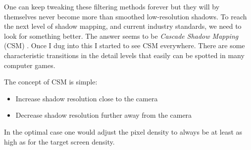 One can keep tweaking these filtering methods forever but they will by themselves never become more than smoothed low-resolution shadows. To reach the next level of shadow mapping, and current industry standards, we need to look for something better. The answer seems to be \textit{Cascade Shadow Mapping} (CSM) \cite{CascadeShadowMapping}. Once I dug into this I started to see CSM everywhere. There are some characteristic transitions in the detail levels that easily can be spotted in many computer games.

The concept of CSM is simple:

\begin{itemize}
\item Increase shadow resolution close to the camera
\item Decrease shadow resolution further away from the camera
\end{itemize}

In the optimal case one would adjust the pixel density to always be at least as high as for the target screen density. 


